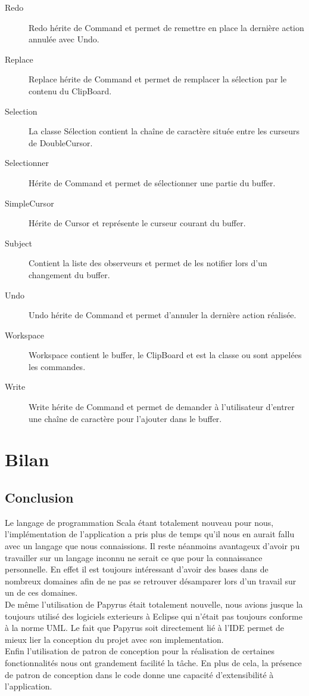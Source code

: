 \documentclass[11pt,a4paper,oldfontcommands]{memoir}
\begin{document}
\begin{description}
  \item[Redo] Redo hérite de Command et permet de remettre en place la dernière action annulée avec Undo.
  \item[Replace] Replace hérite de Command et permet de remplacer la sélection par le contenu du ClipBoard.
  \item[Selection] La classe Sélection contient la chaîne de caractère située entre les curseurs de DoubleCursor.
  \item[Selectionner] Hérite de Command et permet de sélectionner une partie du buffer.
  \item[SimpleCursor] Hérite de Cursor et représente le curseur courant du buffer.
  \item[Subject] Contient la liste des observeurs et permet de les notifier lors d'un changement du buffer.
  \item[Undo] Undo hérite de Command et permet d'annuler la dernière action réalisée.
  \item[Workspace] Workspace contient le buffer, le ClipBoard et est la classe ou sont appelées les commandes.
  \item[Write] Write hérite de Command et permet de demander à l'utilisateur d'entrer une chaîne de caractère pour l'ajouter dans le buffer.
\end{description}
\chapter{Bilan}
\section{Conclusion}
Le langage de programmation Scala étant totalement nouveau pour nous, l'implémentation de l'application a pris plus de temps qu'il nous en aurait fallu avec un langage que nous connaissions. Il reste néanmoins avantageux d'avoir pu travailler sur un langage inconnu ne serait ce que pour la connaissance personnelle. En effet il est toujours intéressant d'avoir des bases dans de nombreux domaines afin de ne pas se retrouver désamparer lors d'un travail sur un de ces domaines. \\
De même l'utilisation de Papyrus était totalement nouvelle, nous avions jusque la toujours utilisé des logiciels exterieurs à Eclipse qui n'était pas toujours conforme à la norme UML. Le fait que Papyrus soit directement lié à l'IDE permet de mieux lier la conception du projet avec son implementation.\\
Enfin l'utilisation de patron de conception pour la réalisation de certaines fonctionnalités nous ont grandement facilité la tâche. En plus de cela, la présence de patron de conception dans le code donne une capacité d'extensibilité à l'application.
\end{document}

